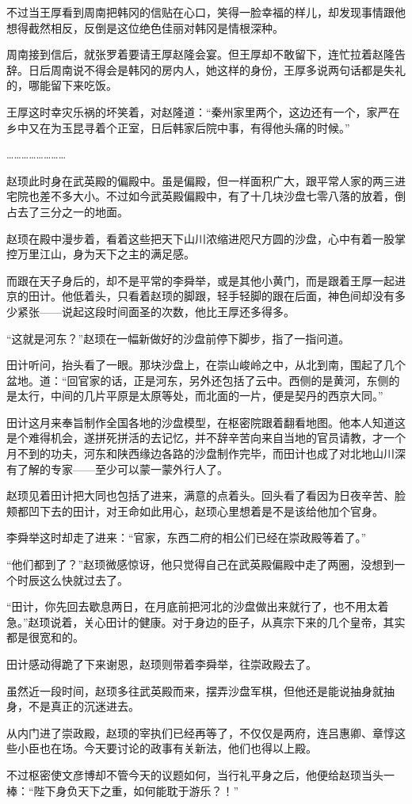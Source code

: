 不过当王厚看到周南把韩冈的信贴在心口，笑得一脸幸福的样儿，却发现事情跟他想得截然相反，反倒是这位绝色佳丽对韩冈是情根深种。

周南接到信后，就张罗着要请王厚赵隆会宴。但王厚却不敢留下，连忙拉着赵隆告辞。日后周南说不得会是韩冈的房内人，她这样的身份，王厚多说两句话都是失礼的，哪能留下来吃饭。

王厚这时幸灾乐祸的坏笑着，对赵隆道：“秦州家里两个，这边还有一个，家严在乡中又在为玉昆寻着个正室，日后韩家后院中事，有得他头痛的时候。”

……………………

赵顼此时身在武英殿的偏殿中。虽是偏殿，但一样面积广大，跟平常人家的两三进宅院也差不多大小。不过如今武英殿偏殿中，有了十几块沙盘七零八落的放着，倒占去了三分之一的地面。

赵顼在殿中漫步着，看着这些把天下山川浓缩进咫尺方圆的沙盘，心中有着一股掌控万里江山，身为天下之主的满足感。

而跟在天子身后的，却不是平常的李舜举，或是其他小黄门，而是跟着王厚一起进京的田计。他低着头，只看着赵顼的脚跟，轻手轻脚的跟在后面，神色间却没有多少紧张——说起这段时间面圣的次数，他比王厚还多得多。

“这就是河东？”赵顼在一幅新做好的沙盘前停下脚步，指了一指问道。

田计听问，抬头看了一眼。那块沙盘上，在崇山峻岭之中，从北到南，围起了几个盆地。道：“回官家的话，正是河东，另外还包括了云中。西侧的是黄河，东侧的是太行，中间的几片平原是太原等处，而北面的一片，便是契丹的西京大同。”

田计这月来奉旨制作全国各地的沙盘模型，在枢密院跟着翻看地图。他本人知道这是个难得机会，遂拼死拼活的去记忆，并不辞辛苦向来自当地的官员请教，才一个月不到的功夫，河东和陕西缘边各路的沙盘制作完毕，而田计也成了对北地山川深有了解的专家——至少可以蒙一蒙外行人了。

赵顼见着田计把大同也包括了进来，满意的点着头。回头看了看因为日夜辛苦、脸颊都凹下去的田计，对王命如此用心，赵顼心里想着是不是该给他加个官身。

李舜举这时却走了进来：“官家，东西二府的相公们已经在崇政殿等着了。”

“他们都到了？”赵顼微感惊讶，他只觉得自己在武英殿偏殿中走了两圈，没想到一个时辰这么快就过去了。

“田计，你先回去歇息两日，在月底前把河北的沙盘做出来就行了，也不用太着急。”赵顼说着，关心田计的健康。对于身边的臣子，从真宗下来的几个皇帝，其实都是很宽和的。

田计感动得跪了下来谢恩，赵顼则带着李舜举，往崇政殿去了。

虽然近一段时间，赵顼多往武英殿而来，摆弄沙盘军棋，但他还是能说抽身就抽身，不是真正的沉迷进去。

从内门进了崇政殿，赵顼的宰执们已经再等了，不仅仅是两府，连吕惠卿、章惇这些小臣也在场。今天要讨论的政事有关新法，他们也得以上殿。

不过枢密使文彦博却不管今天的议题如何，当行礼平身之后，他便给赵顼当头一棒：“陛下身负天下之重，如何能耽于游乐？！”

